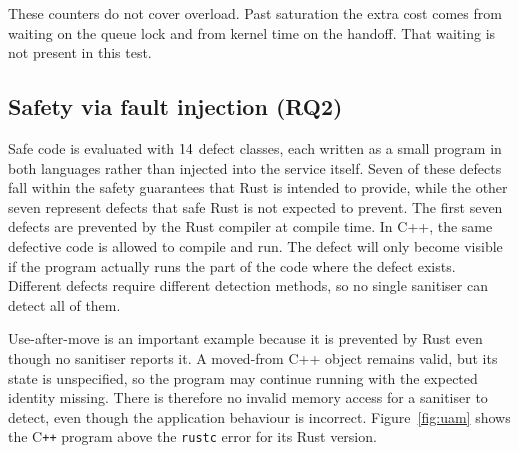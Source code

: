 \documentclass[english,oneside,a4paper,censored,csm,software-track-2020]{HYthesisML}
\begin{document}
These counters do not cover overload. Past saturation the extra cost
comes from waiting on the queue lock and from kernel time on the
handoff. That waiting is not present in this test.

\FloatBarrier
\subsection{Safety via fault injection (RQ2)}\label{sec:safetyresults}
Safe code is evaluated with $14$ defect classes, each written as a
small program in both languages rather than
injected into the service itself. Seven of these defects fall within the safety guarantees that
Rust is intended to provide, while the other seven represent defects that safe
Rust is not expected to prevent. The first seven defects are prevented by the 
Rust compiler at compile time. In C++, the same defective code is allowed to 
compile and run. The defect will only become visible if the program actually runs 
the part of the code where the defect exists. Different defects require different 
detection methods, so no single sanitiser can detect all of them.


Use-after-move is an important example because it is prevented by Rust even
though no sanitiser reports it. A moved-from C++ object remains valid, but its
state is unspecified, so the program may continue running with the expected
identity missing. There is therefore no invalid memory access for a sanitiser
to detect, even though the application behaviour is incorrect. Figure~\ref{fig:uam} shows the C\texttt{++} program
above the \texttt{rustc} error for its Rust version.
\end{document}
